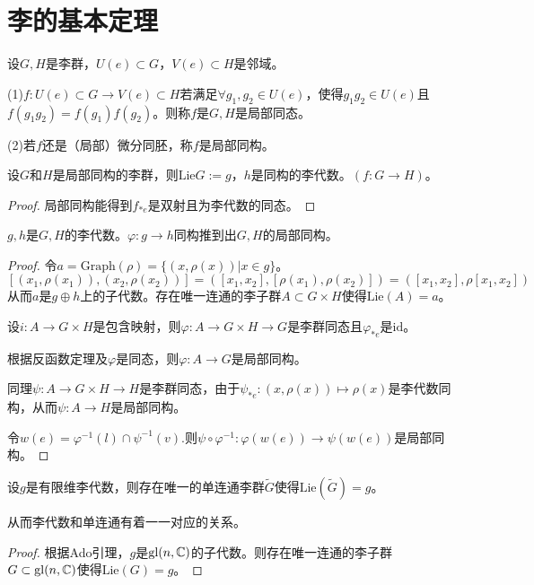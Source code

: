 \section{李的基本定理}
\begin{definition}
    设$G,H$是李群，$U(e) \subset G$，$V(e) \subset H$是邻域。

    (1)$f:U(e)\subset G \to V(e) \subset H$若满足$\forall g_1,g_2 \in U(e)$，使得$g_1g_2\in U(e)$且$f(g_1g_2)=f(g_1)f(g_2)$。则称$f$是$G,H$是局部同态。

    (2)若$f$还是（局部）微分同胚，称$f$是局部同构。 
\end{definition}
\begin{theorem}[李的第一基本定理]
    设$G$和$H$是局部同构的李群，则$\mathrm{Lie}G:=g$，$h$是同构的李代数。$(f: G \to H)$。
\end{theorem}
\begin{proof}
    局部同构能得到$f_{*e}$是双射且为李代数的同态。
\end{proof}
\begin{theorem}[李的第二定理]
    $g,h$是$G,H$的李代数。$\varphi:g \to h$同构推到出$G,H$的局部同构。
\end{theorem}
\begin{proof}
    令$a=\mathrm{Graph}(\rho)=\{(x,\rho(x))|x\in g\}$。
    $$
    [(x_1,\rho(x_1)),(x_2,\rho(x_2))]=([x_1,x_2],[\rho(x_1),\rho(x_2)])=([x_1,x_2],\rho[x_1,x_2])
    $$
    从而$a$是$g \oplus h$上的子代数。存在唯一连通的李子群$A \subset G\times H$使得$\mathrm{Lie}(A)=a$。

    设$i: A \to G \times H$是包含映射，则$\varphi:A \to G\times H \to G$是李群同态且$\varphi_{*e}$是$\mathrm{id}$。

    根据反函数定理及$\varphi$是同态，则$\varphi:A \to G$是局部同构。

    同理$\psi: A \to G\times H \to H$是李群同态，由于$\psi_{*e}:(x,\rho(x))\mapsto \rho(x)$是李代数同构，从而$\psi:A \to H$是局部同构。

    令$w(e)=\varphi^{-1}(l)\cap \psi^{-1}(v)$.则$\psi \circ \varphi^{-1}:\varphi(w(e)) \to \psi(w(e))$是局部同构。
    \end{proof}
    \begin{theorem}[李的第三定理]
        设$g$是有限维李代数，则存在唯一的单连通李群$\tilde{G}$使得$\mathrm{Lie}(\tilde{G})=g$。

        从而李代数和单连通有着一一对应的关系。
    \end{theorem}
    \begin{proof}
        根据Ado引理，$g$是$\mathrm{gl}(n,\mathbb{C})$的子代数。则存在唯一连通的李子群$G \subset \mathrm{gl}(n,\mathbb{C})$使得$\mathrm{Lie}(G)=g$。


    \end{proof}
